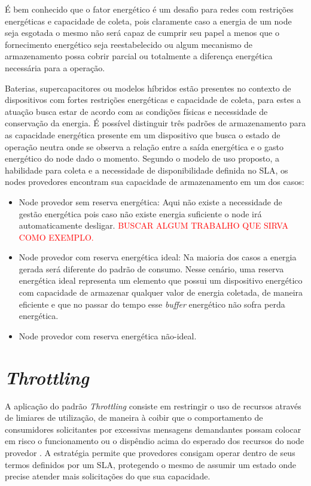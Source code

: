 É bem conhecido que o fator energético é um desafio para redes com restrições energéticas e capacidade de coleta, pois claramente caso a energia de um node seja esgotada o mesmo não será capaz de cumprir seu papel a menos que o fornecimento energético seja reestabelecido ou algum mecanismo de armazenamento possa cobrir parcial ou totalmente a diferença energética necessária para a operação.

Baterias, supercapacitores ou modelos híbridos estão presentes no contexto de dispositivos com fortes restrições energéticas e capacidade de coleta, para estes a atuação busca estar de acordo com as condições físicas e necessidade de conservação da energia. É possível distinguir três padrões de armazenamento para as capacidade energética presente em um dispositivo que busca o estado de operação neutra onde se observa a relação entre a saída energética e o gasto energético do node dado o momento. Segundo o modelo de uso proposto, a habilidade para coleta e a necessidade de disponibilidade definida no \acs{SLA}, os nodes provedores encontram sua capacidade de armazenamento em um dos casos:

\begin{itemize}
    \item Node provedor sem reserva energética: Aqui não existe a necessidade de gestão energética pois caso não existe energia suficiente o node irá automaticamente desligar. \textcolor{red}{BUSCAR ALGUM TRABALHO QUE SIRVA COMO EXEMPLO.}
    
    \item Node provedor com reserva energética ideal: Na maioria dos casos a energia gerada será diferente do padrão de consumo. Nesse cenário, uma reserva energética ideal representa um elemento que possui um dispositivo energético com capacidade de armazenar qualquer valor de energia coletada, de maneira eficiente e que no passar do tempo esse \textit{buffer} energético não sofra perda energética. 
    
    \item Node provedor com reserva energética não-ideal.
\end{itemize}

\section{\textit{Throttling}}


A aplicação do padrão \textit{Throttling} consiste em restringir o uso de recursos através de limiares de utilização, de maneira à coibir que o comportamento de consumidores solicitantes por excessivas mensagens demandantes possam colocar em risco o funcionamento ou o dispêndio acima do esperado dos recursos do node provedor \cite{martinekuan_throttling_nodate}. A estratégia permite que provedores consigam operar dentro de seus termos definidos por um \acf{SLA}, protegendo o mesmo de assumir um estado onde precise atender mais solicitações do que sua capacidade.

